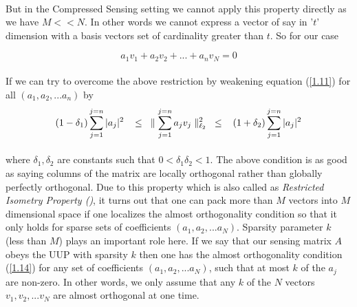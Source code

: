 \paragraph{}But in the Compressed Sensing setting we cannot apply this property directly as we have $M << N$. In other words we 
cannot express a vector of say in '$t$' dimension with a basis vectors set of cardinality greater than $t$. So for our case

\begin{equation}
 a_1 v_1 + a_2 v_2 + ... +a_n v_N =0
\label{1.13}
\end{equation}
 
\paragraph{}If we can try to overcome the above restriction by weakening equation (\ref{1.11}) for all $(a_1,a_2, ... a_n)$ by
\begin{equation}
  (1-\delta_1)\displaystyle\sum\limits_{j=1}^{j=n} |a_j|^2 \hspace{3mm} \leq \hspace{3mm} \parallel \displaystyle\sum\limits_{j=1}^{j=n} a_j v_j \parallel_{\ell_2}^2  \hspace{3mm} \leq \hspace{3mm} (1+ \delta_2)\displaystyle\sum\limits_{j=1}^{j=n} |a_j|^2
\label{1.14}
\end{equation}
\paragraph{}where $\delta_1,\delta_2$ are constants such that $0 < \delta_1 \delta_2< 1 $. The above condition is as good
as saying columns of the matrix are locally orthogonal rather than globally perfectly orthogonal. Due to this property 
which is also called as \emph{Restricted Isometry Property (\cite{cand05, cand07})}, it turns out that one can pack more 
than $M$ vectors into $M$ dimensional space if one localizes the almost orthogonality condition so that it only holds for sparse sets of coefficients $(a_1,a_2, ... a_N)$. 
Sparsity parameter $k$ (less than $M$) plays an important role here. If we say that our sensing matrix $A$ obeys the UUP 
with sparsity $k$ then one has the almost orthogonality condition (\ref{1.14}) for any set of coefficients $(a_1,a_2, ... a_N)$, 
such that at most $k$ of the $a_j$ are non-zero. In other words, we only assume that any $k$ of the $N$ vectors $v_1, v_2,... v_N$
are almost orthogonal at one time. 

